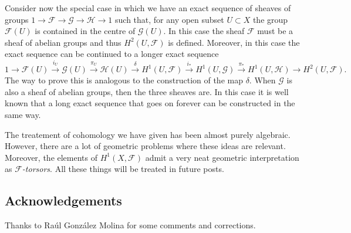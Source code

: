 \documentclass[12pt,a4paper]{article}
\begin{document}
	      Consider now the special case in which we have an exact sequence of sheaves of groups $1\rightarrow \mathcal{F} \rightarrow \mathcal{G} \rightarrow \mathcal{H} \rightarrow 1$ such that, for any open subset $U \subset X$ the group $\mathcal{F}(U)$ is contained in the centre of $\mathcal{G}(U)$. In this case the sheaf $\mathcal{F}$ must be a sheaf of abelian groups and thus $H^2(U,\mathcal{F})$ is defined. Moreover, in this case the exact sequence can be continued to a longer exact sequence
	    \begin{equation*}
	      1\rightarrow \mathcal{F}(U) \overset{i_U}{\rightarrow} \mathcal{G}(U) \overset{\pi_U}{\rightarrow} \mathcal{H}(U) \overset{\delta}{\rightarrow} H^1(U,\mathcal{F}) \overset{i_*}{\rightarrow} H^1(U,\mathcal{G}) \overset{\pi_*}{\rightarrow} H^1(U,\mathcal{H}) \rightarrow H^2(U,\mathcal{F}).
	    \end{equation*}
	    The way to prove this is analogous to the construction of the map $\delta$.
When $\mathcal{G}$ is also a sheaf of abelian groups, then the three sheaves are. In this case it is well known that a long exact sequence that goes on forever can be constructed in the same way.

The treatement of cohomology we have given has been almost purely algebraic. However, there are a lot of geometric problems where these ideas are relevant. Moreover, the elements of $H^1(X,\mathcal{F})$ admit a very neat geometric interpretation as \emph{$\mathcal{F}$-torsors}. All these things will be treated in future posts.


\subsection*{Acknowledgements}
Thanks to Raúl González Molina for some comments and corrections.
\end{document}
